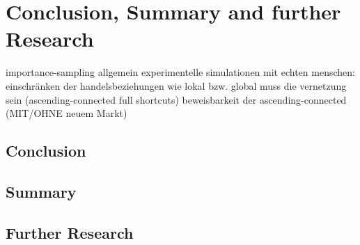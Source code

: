 \documentclass[Bachelorarbeit.tex]{subfiles}
\begin{document}
\chapter{Conclusion, Summary and further Research}
importance-sampling allgemein
experimentelle simulationen mit echten menschen: einschränken der handelsbeziehungen
wie lokal bzw. global muss die vernetzung sein (ascending-connected full shortcuts)
beweisbarkeit der ascending-connected (MIT/OHNE neuem Markt)
	
\section{Conclusion}

\section{Summary}

\section{Further Research}
\end{document}
